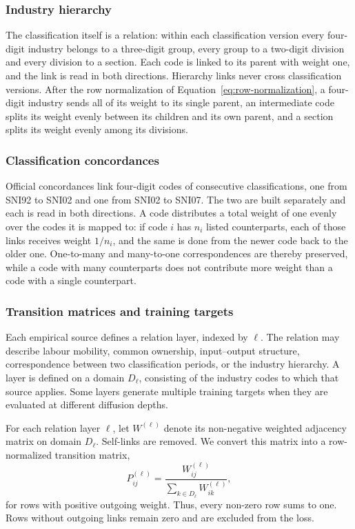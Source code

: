 \documentclass[9pt,twoside]{pnas-new}
\begin{document}
\subsubsection{Industry hierarchy}
The classification itself is a relation: within each classification version every four-digit
industry belongs to a three-digit group, every group to a two-digit division
and every division to a section. Each code is linked to its parent with weight
one, and the link is read in both directions. Hierarchy links never cross
classification versions. After the row normalization of
Equation~\eqref{eq:row-normalization}, a four-digit industry sends all of its
weight to its single parent, an intermediate code splits its weight evenly
between its children and its own parent, and a section splits its weight evenly
among its divisions.

\subsubsection{Classification concordances}
\label{subsubsec:cross-period-concordances}

Official concordances link four-digit codes of consecutive classifications, one
from SNI92 to SNI02 and one from SNI02 to SNI07. The two are built separately
and each is read in both directions. A code distributes a total weight of one
evenly over the codes it is mapped to: if code $i$ has $n_i$ listed
counterparts, each of those links receives weight $1/n_i$, and the same is done
from the newer code back to the older one. One-to-many and many-to-one
correspondences are thereby preserved, while a code with many counterparts does
not contribute more weight than a code with a single counterpart.

\subsubsection{Transition matrices and training targets}
\label{subsec:diffusion-targets}

Each empirical source defines a relation layer, indexed by $\ell$. The relation
may describe labour mobility, common ownership, input--output structure,
correspondence between two classification periods, or the industry hierarchy.
A layer is defined on a domain $D_\ell$, consisting of the industry codes to
which that source applies. Some layers generate multiple training targets when
they are evaluated at different diffusion depths.

For each relation layer $\ell$, let $W^{(\ell)}$ denote its non-negative
weighted adjacency matrix on domain $D_\ell$. Self-links are removed. We convert
this matrix into a row-normalized transition matrix,
\begin{equation}
P^{(\ell)}_{ij}
=
\frac{W^{(\ell)}_{ij}}
{\sum_{k\in D_\ell} W^{(\ell)}_{ik}},
\label{eq:row-normalization}
\end{equation}
for rows with positive outgoing weight. Thus, every non-zero row sums to one.
Rows without outgoing links remain zero and are excluded from the loss.
\end{document}

